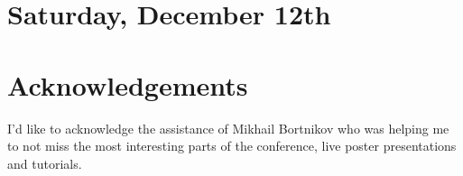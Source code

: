 \documentclass[11pt]{article}
\begin{document}
\section{Saturday, December 12th}


\section{Acknowledgements}
I’d like to acknowledge the assistance of Mikhail Bortnikov who was helping me to not miss the most interesting parts of the conference, live poster presentations and tutorials. 


\newpage


\end{document}
